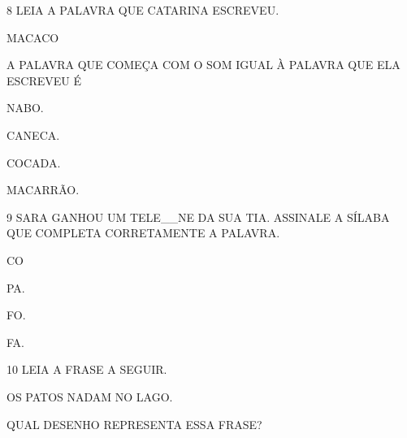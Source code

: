 \num{8} LEIA A PALAVRA QUE CATARINA ESCREVEU.

\begin{myquote}
MACACO
\end{myquote}

A PALAVRA QUE COMEÇA COM O SOM IGUAL À PALAVRA QUE ELA ESCREVEU É 

\begin{escolha}
\item NABO.

\item CANECA.

\item COCADA.

\item MACARRÃO.
\end{escolha}

\coment{}

\num{9} SARA GANHOU UM TELE\_\_NE DA SUA TIA. ASSINALE A SÍLABA QUE COMPLETA CORRETAMENTE A PALAVRA.

\begin{escolha}
\item CO

\item PA.

\item FO.

\item FA.
\end{escolha}

\num{10} LEIA A FRASE A SEGUIR.

\begin{myquote}
OS PATOS NADAM NO LAGO.
\end{myquote}

QUAL DESENHO REPRESENTA ESSA FRASE?

